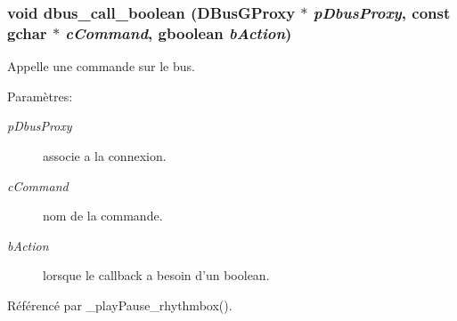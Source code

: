 \subsubsection{\setlength{\rightskip}{0pt plus 5cm}void dbus\_\-call\_\-boolean (DBusGProxy $\ast$ {\em pDbusProxy}, \/  const gchar $\ast$ {\em cCommand}, \/  gboolean {\em bAction})}\label{cid-dbus_8c_7226d5c3c5206d7b17f93dc51e2cec10}


Appelle une commande sur le bus. \begin{Desc}
\item[Paramètres:]
\begin{description}
\item[{\em pDbusProxy}]associe a la connexion. \item[{\em cCommand}]nom de la commande. \item[{\em bAction}]lorsque le callback a besoin d'un boolean. \end{description}
\end{Desc}


Référencé par \_\-playPause\_\-rhythmbox().
